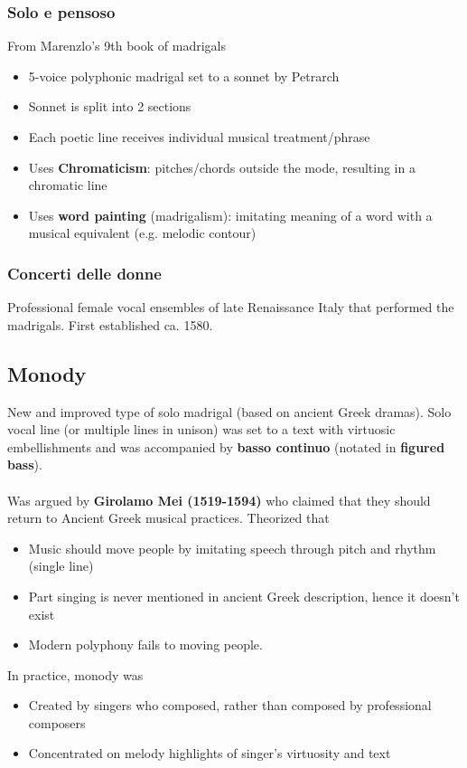 \documentclass{article}
\begin{document}
  \subsubsection{Solo e pensoso}
  From Marenzlo's 9th book of madrigals
  \begin{itemize}
    \item 5-voice polyphonic madrigal set to a sonnet by Petrarch
    \item Sonnet is split into 2 sections
    \item Each poetic line receives individual musical treatment/phrase
    \item Uses \textbf{Chromaticism}: pitches/chords outside the mode, resulting in a chromatic line
    \item Uses \textbf{word painting} (madrigalism): imitating meaning of a word with a musical equivalent (e.g. melodic contour)
  \end{itemize}
  \subsubsection{Concerti delle donne}
  Professional female vocal ensembles of late Renaissance Italy that performed the madrigals. First established ca. 1580.
  \subsection{Monody}
  New and improved type of solo madrigal (based on ancient Greek dramas). Solo vocal line (or multiple lines in unison) was set to a text with virtuosic embellishments and was accompanied by \textbf{basso continuo} (notated in \textbf{figured bass}). \\ \\
  Was argued by \textbf{Girolamo Mei (1519-1594)} who claimed that they should return to Ancient Greek musical practices. Theorized that
  \begin{itemize}
    \item Music should move people by imitating speech through pitch and rhythm (single line)
    \item Part singing is never mentioned in ancient Greek description, hence it doesn't exist
    \item Modern polyphony fails to moving people.
  \end{itemize}
  In practice, monody was
  \begin{itemize}
    \item Created by singers who composed, rather than composed by professional composers
    \item Concentrated on melody highlights of singer's virtuosity and text
  \end{itemize}
\end{document}
